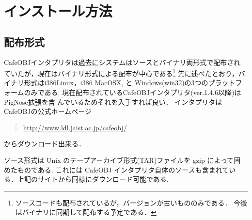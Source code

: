 

\section{インストール方法}

\subsection{配布形式}
\label{sec:distribution}
CafeOBJインタプリタは過去にシステムはソースとバイナリ両形式で配布され
ていたが，現在はバイナリ形式による配布が中心である\footnote{%
ソースコードも配布されているが，バージョンが古いもののみである．
今後はバイナリに同期して配布する予定である．}
先に述べたとおり，バイナリ形式はi386Linux，i386 MacOSX, と
Windows(win32)の3つのプラットフォームのみである.
現在配布されているCafeOBJインタプリタ(ver.1.4.6以降)はPigNose拡張を含
んでいるためそれを入手すれば良い．
インタプリタはCafeOBJの公式ホームページ
\begin{quote}
  \url{http://www.ldl.jaist.ac.jp/cafeobj/}
\end{quote}
からダウンロード出来る．

ソース形式は Unix のテープアーカイブ形式(TAR)ファイルを gzip によって固
めたものである. これには CafeOBJ インタプリタ自体のソースも含まれてい
る．上記のサイトから同様にダウンロード可能である. 

 

